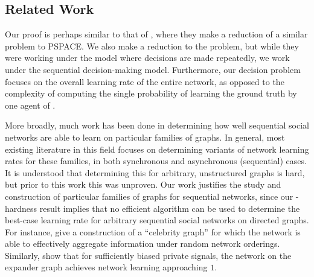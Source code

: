 \subsection*{Related Work}

Our proof is perhaps similar to that of \cite{hazla2019reasoning}, where they make a reduction of a similar problem to PSPACE.
We also make a reduction to the \sat{} problem, but while they were working under the model where decisions are made repeatedly, we work under the sequential decision-making model.
Furthermore, our decision problem focuses on the overall learning rate of the entire network, as opposed to the complexity of computing the single probability of learning the ground truth by one agent of \cite{hazla2019reasoning}.

More broadly, much work has been done in determining how well sequential social networks are able to learn on particular families of graphs. In general, most existing literature in this field focuses on determining variants of network learning rates for these families, in both synchronous and asynchronous (sequential) cases. It is understood that determining this for arbitrary, unstructured graphs is hard, but prior to this work this was unproven. Our work justifies the study and construction of particular families of graphs for sequential networks, since our \np-hardness result implies that no efficient algorithm can be used to determine the best-case learning rate for arbitrary sequential social networks on directed graphs. For instance, \cite{multiissue} give a construction of a ``celebrity graph'' for which the network is able to effectively aggregate information under random network orderings. Similarly, \cite{Mossel_2013} show that for sufficiently biased private signals, the network on the expander graph achieves network learning approaching $1$. 

